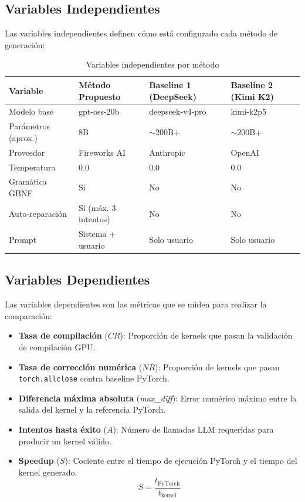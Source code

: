 \documentclass[12pt]{article}
\begin{document}
\subsection{Variables Independientes}

Las variables independientes definen cómo está configurado cada método de generación:

\begin{table}[H]
\centering
\caption{Variables independientes por método}
\begin{tabular}{llll}
\toprule
\textbf{Variable} & \textbf{Método Propuesto} & \textbf{Baseline 1 (DeepSeek)} & \textbf{Baseline 2 (Kimi K2)} \\
\midrule
Modelo base & gpt-oss-20b & deepseek-v4-pro & kimi-k2p5 \\
Parámetros (aprox.) & 8B & $\sim$200B+ & $\sim$200B+ \\
Proveedor & Fireworks AI & Anthropic & OpenAI \\
Temperatura & 0.0 & 0.0 & 0.0 \\
Gramática GBNF & Sí & No & No \\
Auto-reparación & Sí (máx. 3 intentos) & No & No \\
Prompt & Sistema + usuario & Solo usuario & Solo usuario \\
\bottomrule
\end{tabular}
\end{table}

\subsection{Variables Dependientes}

Las variables dependientes son las métricas que se miden para realizar la comparación:

\begin{itemize}
  \item \textbf{Tasa de compilación} ($CR$): Proporción de kernels que pasan la
    validación de compilación GPU.
  \item \textbf{Tasa de corrección numérica} ($NR$): Proporción de kernels que pasan
    \texttt{torch.allclose} contra baseline PyTorch.
  \item \textbf{Diferencia máxima absoluta} (\textit{max\_diff}): Error numérico
    máximo entre la salida del kernel y la referencia PyTorch.
  \item \textbf{Intentos hasta éxito} ($A$): Número de llamadas LLM requeridas para
    producir un kernel válido.
  \item \textbf{Speedup} ($S$): Cociente entre el tiempo de ejecución PyTorch y el
    tiempo del kernel generado.
    \[S = \frac{t_{\text{PyTorch}}}{t_{\text{kernel}}}\]
\end{itemize}
\end{document}
